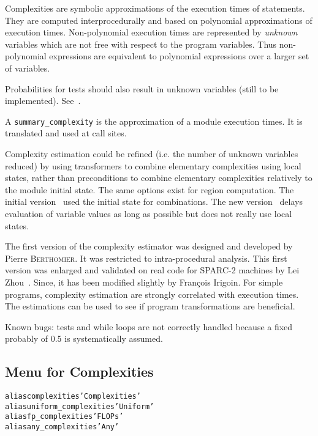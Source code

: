\documentclass[a4paper]{report}
\newenvironment{PipsMake}{\begin{alltt}}{\end{alltt}}
\newenvironment{PipsPass}[1]{\label{pass:#1}}{}
\begin{document}
\begin{PipsPass}{complexities}
Complexities are symbolic approximations of the execution times of
statements. They are computed interprocedurally and based on polynomial
approximations of execution times. Non-polynomial execution times are
represented by {\em unknown} variables which are not free with respect
to the program variables. Thus non-polynomial expressions are equivalent
to polynomial expressions over a larger set of variables.

Probabilities for tests should also result in
unknown variables (still to be implemented). See~\cite{Zho94}.

A \verb+summary_complexity+ is the approximation of a module execution
times. It is translated and used at call sites.

Complexity estimation could be refined (i.e. the number of unknown
variables reduced) by using transformers to combine elementary
complexities using local states, rather than preconditions to combine
elementary complexities relatively to the module initial state. The same
options exist for region computation. The initial version~\cite{Pla90}
used the initial state for combinations. The new version~\cite{CI95}
delays evaluation of variable values as long as possible but does not
really use local states.

The first version of the complexity estimator was designed and
developed by Pierre \textsc{Berthomier}. It was restricted to intra-procedural
analysis. This first version was enlarged and validated on real code for
SPARC-2 machines by Lei Z{\sc hou}~\cite{Zho94}. Since, it has been modified
slightly by Fran\c{c}ois I{\sc rigoin}. For simple programs, complexity
estimation are strongly correlated with execution times. The estimations
can be used to see if program transformations are beneficial.

Known bugs: tests and while loops are not correctly handled because a
fixed probably of 0.5 is systematically assumed.
\end{PipsPass}

\subsection{Menu for Complexities}

\begin{PipsMake}
alias complexities      'Complexities'
alias uniform_complexities      'Uniform'
alias fp_complexities   'FLOPs'
alias any_complexities  'Any'
\end{PipsMake}
\end{document}
